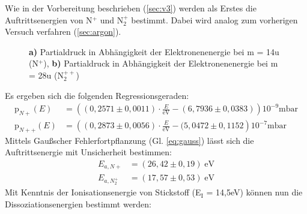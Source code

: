 Wie in der Vorbereitung beschrieben (\ref{sec:v3}) werden als Erstes die Auftrittsenergien von N$^+$ und N$_2^+$ bestimmt. Dabei wird analog zum vorherigen Versuch verfahren (\ref{sec:argon}).\\
\begin{figure}[h]
	\centering
	\caption{\textbf{a)} Partialdruck in Abhängigkeit der Elektronenenergie bei m = 14\;u (N$^+$), \textbf{b)} Partialdruck in Abhängigkeit der Elektronenenergie bei m = 28\;u (N$_2^{++}$)}
	\label{fig:plot_stickstoff}
\end{figure}
Es ergeben sich die folgenden Regressionsgeraden:
\begin{align}
\textrm{p}_{N+}(E) &= \left((0,2571\pm 0,0011)\cdot\frac{E}{\textrm{eV}} - (6,7936\pm 0,0383)\right)10^{-9}\textrm{mbar}\\
\textrm{p}_{N++}(E) &= \left((0,2873\pm 0,0056)\cdot\frac{E}{\textrm{eV}} - (5,0472\pm 0,1152\right)10^{-7}\textrm{mbar}
\end{align}
Mittels Gaußscher Fehlerfortpflanzung (Gl. \ref{eq:gauss}) lässt sich die Auftrittsenergie mit Unsicherheit bestimmen:
\begin{align}
E_{a,N+} &= (26,42\pm 0,19)\;\textrm{eV}\\
E_{a,N_2^+} &= (17,57\pm 0,53)\;\textrm{eV}
\end{align}
Mit Kenntnis der Ionisationsenergie von Stickstoff (E$_\textrm{I}$ = 14,5\;eV) können nun die Dissoziationsenergien bestimmt werden:
